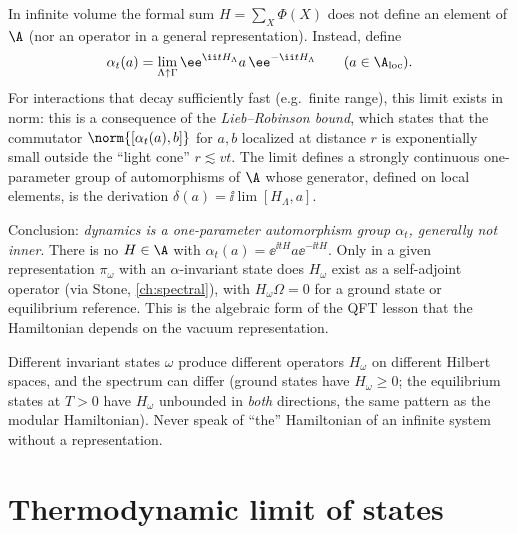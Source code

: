In infinite volume the formal sum $H=\sum_X\Phi(X)$ does not define an element of $\A$ (nor an operator in a general representation). Instead, define
\begin{equation}
\alpha_t(a)=\lim_{\Lambda\uparrow\Gamma}\ee^{\ii tH_\Lambda}a\,\ee^{-\ii tH_\Lambda}\qquad(a\in\A_{\rm loc}).
\end{equation}
For interactions that decay sufficiently fast (e.g.\ finite range), this limit exists in norm: this is a consequence of the \emph{Lieb--Robinson bound}, which states that the commutator $\norm{[\alpha_t(a),b]}$ for $a,b$ localized at distance $r$ is exponentially small outside the ``light cone'' $r\lesssim vt$. The limit defines a strongly continuous one-parameter group of automorphisms of $\A$ whose generator, defined on local elements, is the derivation $\delta(a)=\ii\lim[H_\Lambda,a]$.

Conclusion: \emph{dynamics is a one-parameter automorphism group $\alpha_t$, generally not inner}. There is no $H\in\A$ with $\alpha_t(a)=\ee^{\ii tH}a\ee^{-\ii tH}$. Only in a given representation $\pi_\omega$ with an $\alpha$-invariant state does $H_\omega$ exist as a self-adjoint operator (via Stone, \cref{ch:spectral}), with $H_\omega\Omega=0$ for a ground state or equilibrium reference. This is the algebraic form of the QFT lesson that the Hamiltonian depends on the vacuum representation.

\begin{whatwrong}
Different invariant states $\omega$ produce different operators $H_\omega$ on different Hilbert spaces, and the spectrum can differ (ground states have $H_\omega\ge0$; the equilibrium states at $T>0$ have $H_\omega$ unbounded in \emph{both} directions, the same pattern as the modular Hamiltonian). Never speak of ``the'' Hamiltonian of an infinite system without a representation.
\end{whatwrong}

\section{Thermodynamic limit of states}

